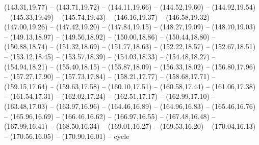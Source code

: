{  (143.31,19.77) -- (143.71,19.72) -- (144.11,19.66) -- (144.52,19.60) -- (144.92,19.54) -- (145.33,19.49) -- (145.74,19.43) --
  (146.16,19.37) -- (146.58,19.32) -- (147.00,19.26) -- (147.42,19.20) -- (147.84,19.15) -- (148.27,19.09) -- (148.70,19.03) --
  (149.13,18.97) -- (149.56,18.92) -- (150.00,18.86) -- (150.44,18.80) -- (150.88,18.74) -- (151.32,18.69) -- (151.77,18.63) --
  (152.22,18.57) -- (152.67,18.51) -- (153.12,18.45) -- (153.57,18.39) -- (154.03,18.33) -- (154.48,18.27) -- (154.94,18.21) --
  (155.40,18.15) -- (155.87,18.09) -- (156.33,18.02) -- (156.80,17.96) -- (157.27,17.90) -- (157.73,17.84) -- (158.21,17.77) --
  (158.68,17.71) -- (159.15,17.64) -- (159.63,17.58) -- (160.10,17.51) -- (160.58,17.44) -- (161.06,17.38) -- (161.54,17.31) --
  (162.02,17.24) -- (162.51,17.17) -- (162.99,17.10) -- (163.48,17.03) -- (163.97,16.96) -- (164.46,16.89) -- (164.96,16.83) --
  (165.46,16.76) -- (165.96,16.69) -- (166.46,16.62) -- (166.97,16.55) -- (167.48,16.48) -- (167.99,16.41) -- (168.50,16.34) --
  (169.01,16.27) -- (169.53,16.20) -- (170.04,16.13) -- (170.56,16.05) -- (170.90,16.01) -- cycle}
\def\Bquad{(89.34,-12.49) -- (176.66,-33.81) -- (176.66,18.30) -- (89.34,39.61) -- cycle}
\def\BqBL{(89.34,-12.49)}
\def\BqBR{(176.66,-33.81)}
\def\BqTR{(176.66,18.30)}
\def\BqTL{(89.34,39.61)}
\def\Alabel{(10.24,23.89)}
\def\Blabel{(180.66,35.30)}
\def\Apanel{(-90.28,-33.81)}
\def\Bpanel{(89.34,-33.81)}
